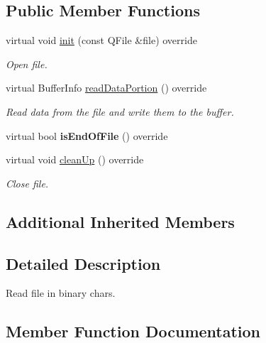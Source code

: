 \subsection*{Public Member Functions}
\begin{DoxyCompactItemize}
\item 
virtual void \hyperlink{classBinaryTransmissionReader_a28c85fe81913ccb4ba6aee44d84dbf7d}{init} (const Q\+File \&file) override
\begin{DoxyCompactList}\small\item\em Open file. \end{DoxyCompactList}\item 
virtual Buffer\+Info \hyperlink{classBinaryTransmissionReader_a003a0b7a500a15ddfc573e6f54006b0c}{read\+Data\+Portion} () override
\begin{DoxyCompactList}\small\item\em Read data from the file and write them to the buffer. \end{DoxyCompactList}\item 
\mbox{\label{classBinaryTransmissionReader_af324c2292bcc28c64d11d754c110e9bf}} 
virtual bool {\bfseries is\+End\+Of\+File} () override
\item 
\mbox{\label{classBinaryTransmissionReader_add9c1a4adb7fe8098d81bb0f5f916c93}} 
virtual void \hyperlink{classBinaryTransmissionReader_add9c1a4adb7fe8098d81bb0f5f916c93}{clean\+Up} () override
\begin{DoxyCompactList}\small\item\em Close file. \end{DoxyCompactList}\end{DoxyCompactItemize}
\subsection*{Additional Inherited Members}


\subsection{Detailed Description}
Read file in binary chars. 

\subsection{Member Function Documentation}
\mbox{\label{classBinaryTransmissionReader_a28c85fe81913ccb4ba6aee44d84dbf7d}} 
